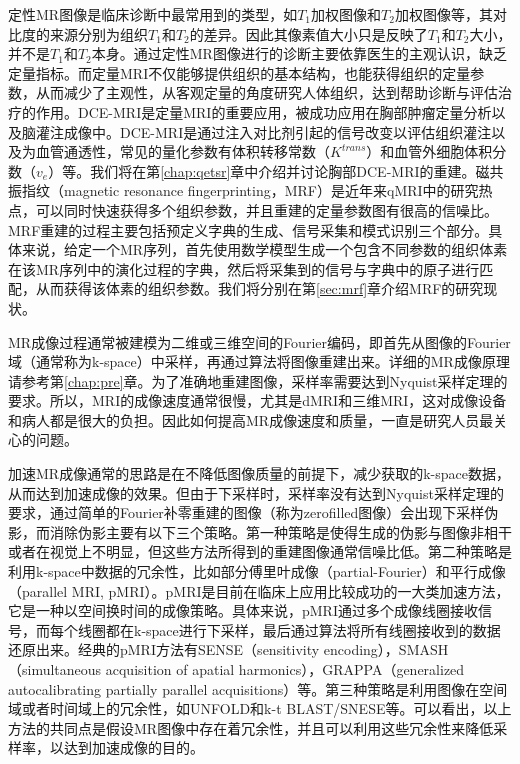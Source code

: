 定性MR图像是临床诊断中最常用到的类型，如$T_1$加权图像和$T_2$加权图像等，其对比度的来源分别为组织$T_1$和$T_2$的差异。因此其像素值大小只是反映了$T_1$和$T_2$大小，并不是$T_1$和$T_2$本身。通过定性MR图像进行的诊断主要依靠医生的主观认识，缺乏定量指标。而定量MRI不仅能够提供组织的基本结构，也能获得组织的定量参数，从而减少了主观性，从客观定量的角度研究人体组织，达到帮助诊断与评估治疗的作用。DCE-MRI\cite{Yankeelov2009}是定量MRI的重要应用，被成功应用在胸部肿瘤定量分析以及脑灌注成像中。DCE-MRI是通过注入对比剂引起的信号改变以评估组织灌注以及为血管通透性，常见的量化参数有体积转移常数（$K^{trans}$）和血管外细胞体积分数（$v_e$）等。我们将在第\ref{chap:qetsr}章中介绍并讨论胸部DCE-MRI的重建。磁共振指纹\cite{mrf}（magnetic resonance fingerprinting，MRF）是近年来qMRI中的研究热点，可以同时快速获得多个组织参数，并且重建的定量参数图有很高的信噪比。MRF重建的过程主要包括预定义字典的生成、信号采集和模式识别三个部分。具体来说，给定一个MR序列，首先使用数学模型生成一个包含不同参数的组织体素在该MR序列中的演化过程的字典，然后将采集到的信号与字典中的原子进行匹配，从而获得该体素的组织参数。我们将分别在第\ref{sec:mrf}章介绍MRF的研究现状。

MR成像过程通常被建模为二维或三维空间的Fourier编码，即首先从图像的Fourier域（通常称为k-space）中采样，再通过算法将图像重建出来。详细的MR成像原理请参考第\ref{chap:pre}章。为了准确地重建图像，采样率需要达到Nyquist采样定理\cite{Nyquist}的要求。所以，MRI的成像速度通常很慢，尤其是dMRI和三维MRI，这对成像设备和病人都是很大的负担。因此如何提高MR成像速度和质量，一直是研究人员最关心的问题。

加速MR成像通常的思路是在不降低图像质量的前提下，减少获取的k-space数据，从而达到加速成像的效果。但由于下采样时，采样率没有达到Nyquist采样定理的要求，通过简单的Fourier补零重建的图像（称为zerofilled图像）会出现下采样伪影，而消除伪影主要有以下三个策略。第一种策略是使得生成的伪影与图像非相干或者在视觉上不明显\cite{Tsai,Marseille,Greiser}，但这些方法所得到的重建图像通常信噪比低。第二种策略是利用k-space中数据的冗余性，比如部分傅里叶成像\cite{McGibney}（partial-Fourier）和平行成像（parallel MRI, pMRI）。pMRI是目前在临床上应用比较成功的一大类加速方法，它是一种以空间换时间的成像策略。具体来说，pMRI通过多个成像线圈接收信号，而每个线圈都在k-space进行下采样，最后通过算法将所有线圈接收到的数据还原出来。经典的pMRI方法有SENSE（sensitivity encoding）\cite{sense}，SMASH（simultaneous acquisition of apatial harmonics）\cite{smash}，GRAPPA（generalized autocalibrating partially parallel acquisitions）\cite{grappa}等。第三种策略是利用图像在空间域或者时间域上的冗余性，如UNFOLD\cite{Madore}和k-t BLAST/SNESE\cite{Tsao}等。可以看出，以上方法的共同点是假设MR图像中存在着冗余性，并且可以利用这些冗余性来降低采样率，以达到加速成像的目的。

